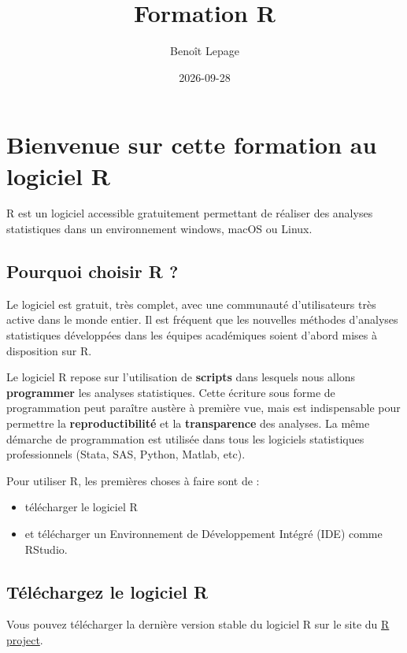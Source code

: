 \documentclass[
]{book}
\title{Formation R}
\author{Benoît Lepage}
\date{2026-09-28}
\providecommand{\tightlist}{%
  \setlength{\itemsep}{0pt}\setlength{\parskip}{0pt}}
\begin{document}
\maketitle

{
\setcounter{tocdepth}{1}
\tableofcontents
}
\chapter{Bienvenue sur cette formation au logiciel R}\label{bienvenue-sur-cette-formation-au-logiciel-r}

R est un logiciel accessible gratuitement permettant de réaliser des analyses statistiques dans un environnement windows, macOS ou Linux.

\section{Pourquoi choisir R ?}\label{pourquoi-choisir-r}

Le logiciel est gratuit, très complet, avec une communauté d'utilisateurs très active dans le monde entier. Il est fréquent que les nouvelles méthodes d'analyses statistiques développées dans les équipes académiques soient d'abord mises à disposition sur R.

Le logiciel R repose sur l'utilisation de \textbf{scripts} dans lesquels nous allons \textbf{programmer} les analyses statistiques. Cette écriture sous forme de programmation peut paraître austère à première vue, mais est indispensable pour permettre la \textbf{reproductibilité} et la \textbf{transparence} des analyses. La même démarche de programmation est utilisée dans tous les logiciels statistiques professionnels (Stata, SAS, Python, Matlab, etc).

Pour utiliser R, les premières choses à faire sont de :

\begin{itemize}
\tightlist
\item
  télécharger le logiciel R
\item
  et télécharger un Environnement de Développement Intégré (IDE) comme RStudio.
\end{itemize}

\section{Téléchargez le logiciel R}\label{tuxe9luxe9chargez-le-logiciel-r}

Vous pouvez télécharger la dernière version stable du logiciel R sur le site du \href{https://www.r-project.org/}{R project}.
\end{document}
